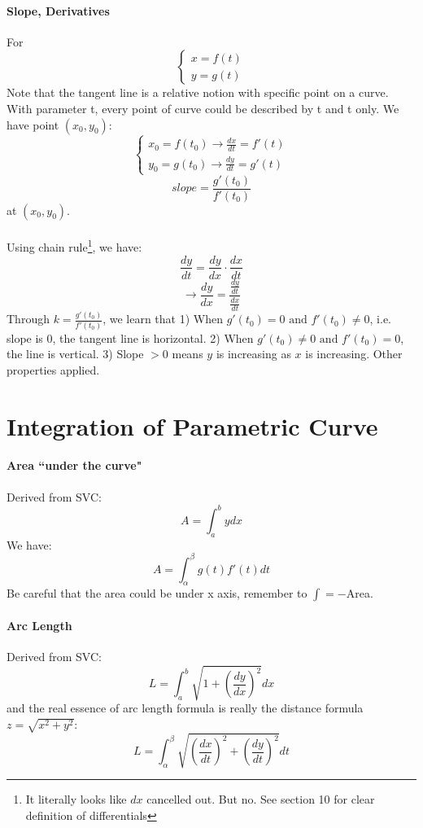 \documentclass[11pt, oneside]{article}   	%
\begin{document}
\paragraph{Slope, Derivatives}
For
\begin{equation}
  \begin{cases}
    x = f(t)\\
    y = g(t)
  \end{cases}
\end{equation}
Note that the tangent line is a relative notion with specific point on a curve. With parameter t, every point of curve could be described by t and t only. We have point $(x_0, y_0)$:
\begin{equation}
  \begin{cases}
    x_0 = f(t_0) \to \frac{dx}{dt} = f'(t)\\
    y_0 = g(t_0) \to \frac{dy}{dt} = g'(t)
  \end{cases}
\end{equation}
$$slope = \frac{g'(t_0)}{{f'(t_0)}}$$ at $(x_0, y_0)$. 

\paragraph{}
Using chain rule\footnote{It literally looks like $dx$ cancelled out. But no. See section 10 for clear definition of differentials}, we have: $$\frac{dy}{dt}=\frac{dy}{dx} \cdot \frac{dx}{dt}$$ $$\to \frac{dy}{dx}=\frac{ \frac{dy}{dt}}{{\frac{dx}{dt}}}$$
Through $k = \frac{g'(t_0)}{f'(t_0)}$, we learn that 1) When $g'(t_0) = 0 \text{ and } f'(t_0)\not= 0$, i.e. slope is 0, the tangent line is horizontal. 2) When $g'(t_0) \not= 0 \text{ and } f'(t_0) = 0$, the line is vertical. 3) Slope $>0$ means $y$ is increasing as $x$ is increasing. Other properties applied. 


\section{Integration of Parametric Curve}
\paragraph{Area ``under the curve"}
Derived from SVC:
$$ A = \int_a^b ydx$$
We have:
$$A = \int_\alpha^\beta g(t)f'(t)dt$$
Be careful that the area could be under x axis, remember to $\int = -$Area. 
\paragraph{Arc Length}
Derived from SVC:
$$L = \int_a^b \sqrt{1+(\frac{dy}{dx})^2}dx$$
and the real essence of arc length formula is really the distance formula $z = \sqrt{x^2 + y^2}$:
$$L = \int_\alpha^\beta \sqrt{(\frac{dx}{dt})^2 + (\frac{dy}{dt})^2}dt$$
\end{document}
